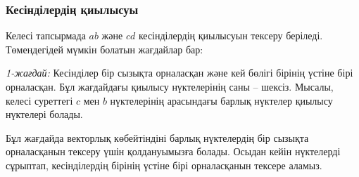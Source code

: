 
\subsubsection{Кесінділердің қиылысуы}


Келесі тапсырмада $ab$ және $cd$ кесінділердің
қиылысуын тексеру беріледі. Төмендегідей мүмкін болатын жағдайлар бар:


\textit{1-жағдай:}
Кесінділер бір сызықта орналасқан және
кей бөлігі бірінің үстіне бірі орналасқан. 
Бұл жағдайдағы қиылысу нүктелерінің саны -- шексіз.
Мысалы, келесі суреттегі $c$ мен $b$ нүктелерінің арасындағы
барлық нүктелер қиылысу нүктелері болады. 

\begin{center}
\end{center}

Бұл жағдайда векторлық көбейтіндіні 
барлық нүктелердің бір сызықта орналасқанын тексеру үшін қолдануымызға
болады. Осыдан кейін нүктелерді сұрыптап, кесінділердің
бірінің үстіне бірі орналасқанын тексере аламыз. 


